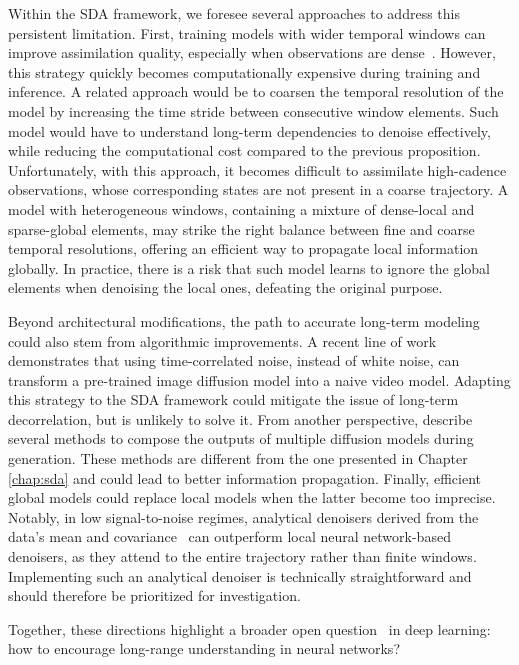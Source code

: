 Within the SDA framework, we foresee several approaches to address this persistent limitation. First, training models with wider temporal windows can improve assimilation quality, especially when observations are dense~\cite{shysheya2024conditional}. However, this strategy quickly becomes computationally expensive during training and inference. A related approach would be to coarsen the temporal resolution of the model by increasing the time stride between consecutive window elements. Such model would have to understand long-term dependencies to denoise effectively, while reducing the computational cost compared to the previous proposition. Unfortunately, with this approach, it becomes difficult to assimilate high-cadence observations, whose corresponding states are not present in a coarse trajectory. A model with heterogeneous windows, containing a mixture of dense-local and sparse-global elements, may strike the right balance between fine and coarse temporal resolutions, offering an efficient way to propagate local information globally. In practice, there is a risk that such model learns to ignore the global elements when denoising the local ones, defeating the original purpose.

Beyond architectural modifications, the path to accurate long-term modeling could also stem from algorithmic improvements. A recent line of work \cite{ge2023preserve, chang2024how, daras2024warped} demonstrates that using time-correlated noise, instead of white noise, can transform a pre-trained image diffusion model into a naive video model. Adapting this strategy to the SDA framework could mitigate the issue of long-term decorrelation, but is unlikely to solve it. From another perspective, \textcite{du2023reduce} describe several methods to compose the outputs of multiple diffusion models during generation. These methods are different from the one presented in Chapter \ref{chap:sda} and could lead to better information propagation. Finally, efficient global models could replace local models when the latter become too imprecise. Notably, in low signal-to-noise regimes, analytical denoisers derived from the data's mean and covariance~\cite{sarkka2013bayesian} can outperform local neural network-based denoisers, as they attend to the entire trajectory rather than finite windows. Implementing such an analytical denoiser is technically straightforward and should therefore be prioritized for investigation.

Together, these directions highlight a broader open question~\cite{beltagy2020longformer, tay2021long, gu2022efficiently, dwivedi2022long, su2024roformer} in deep learning: how to encourage long-range understanding in neural networks?

